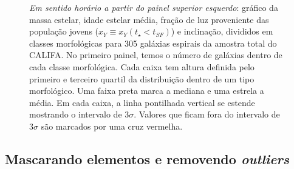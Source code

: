 \begin{figure}
	\centering
	\caption[Classificação por morfologia.]
	{\emph{Em sentido horário a partir do painel superior esquerdo}: gráfico da massa estelar, idade
	estelar média, fração de luz proveniente das população jovens ($x_Y \equiv x_Y(t_\star < t_{SF})$) e
	inclinação, divididos em classes morfológicas para 305 galáxias espirais da amostra total do
	CALIFA. No primeiro painel, temos o número de galáxias dentro de cada classe morfológica. Cada
	caixa tem altura definida pelo primeiro e terceiro quartil da distribuição dentro de um tipo
	morfológico. Uma faixa preta marca a mediana e uma estrela a média. Em cada caixa, a linha
	pontilhada vertical se estende mostrando o intervalo de $3\sigma$. Valores que ficam fora do
	intervalo de $3\sigma$ são marcados por uma cruz vermelha.}
	\label{fig:amostraMorf}
\end{figure}

\subsection{Mascarando elementos e removendo {\em outliers}}
\label{sec:synvsneb:amostra:mask}

